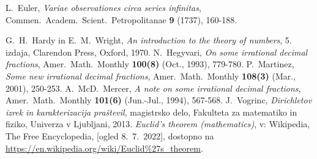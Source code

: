 \documentclass[twoside,11pt]{article}
\begin{document}
\QED







\begin{thebibliography}{1}
    L.~Euler, \emph{Variae observationes circa series infinitas},
    Commen.~Academ.~Scient.~Petropolitanae \textbf{9} (1737), 160-188.

    G.~H.~Hardy in E.~M.~Wright, \emph{An introduction to the theory of numbers}, 
    5. izdaja, Clarendon Press, Oxford, 1970.
    N.~Hegyvari, \emph{On some irrational decimal fractions},
    Amer.~Math.~Monthly \textbf{100(8)}  (Oct., 1993),  779-780.
    P.~Martinez, \emph{Some new irrational decimal fractions},
    Amer.~Math.~Monthly \textbf{108(3)}  (Mar., 2001),  250-253.
    A.~McD.~Mercer, \emph{A note on some irrational decimal fractions},
    Amer.~Math.~Monthly \textbf{101(6)}  (Jun.-Jul., 1994),  567-568.
    J.~Vogrinc, \emph{Dirichletov izrek in karakterizacija praštevil}, 
    magistrsko delo, Fakulteta za matematiko in fiziko, Univerza v Ljubljani, 2013.
    \emph{Euclid's theorem (mathematics)}, v: Wikipedia, The Free Encyclopedia, [ogled 8.~7.~2022], 
    dostopno na \url{https://en.wikipedia.org/wiki/Euclid%27s_theorem}.
    
\end{thebibliography}
\end{document}
